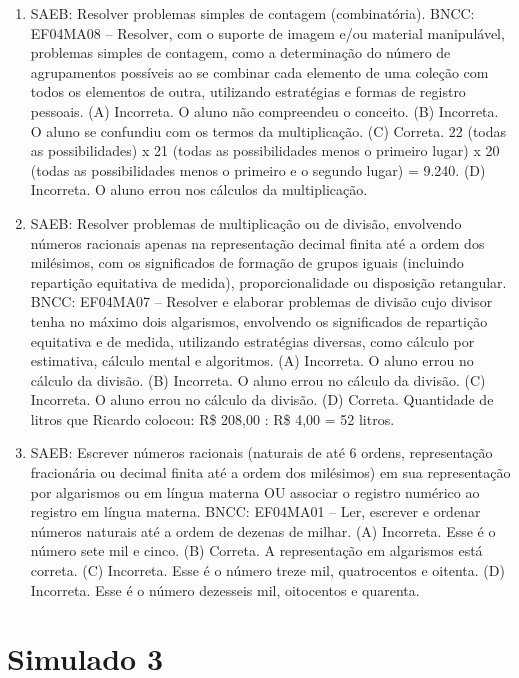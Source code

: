 \begin{enumerate}
\item
SAEB: Resolver problemas simples de contagem (combinatória).
BNCC: EF04MA08 -- Resolver, com o suporte de imagem e/ou material manipulável, problemas simples
de contagem, como a determinação do número de agrupamentos possíveis ao se combinar cada
elemento de uma coleção com todos os elementos de outra, utilizando estratégias e formas de
registro pessoais.
(A) Incorreta. O aluno não compreendeu o conceito.
(B) Incorreta. O aluno se confundiu com os termos da multiplicação.
(C) Correta. 22 (todas as possibilidades) x 21 (todas as possibilidades menos o primeiro lugar) x 20 (todas as possibilidades menos o primeiro e o segundo lugar) = 9.240.
(D) Incorreta. O aluno errou nos cálculos da multiplicação.

\item
SAEB: Resolver problemas de multiplicação ou de divisão,
envolvendo números racionais apenas na representação decimal finita até
a ordem dos milésimos, com os significados de formação de grupos iguais
(incluindo repartição equitativa de medida), proporcionalidade ou
disposição retangular.
BNCC: EF04MA07 -- Resolver e elaborar problemas de divisão cujo divisor tenha no máximo dois algarismos,
envolvendo os significados de repartição equitativa e de medida, utilizando estratégias diversas,
como cálculo por estimativa, cálculo mental e algoritmos.
(A) Incorreta. O aluno errou no cálculo da divisão.
(B) Incorreta. O aluno errou no cálculo da divisão.
(C) Incorreta. O aluno errou no cálculo da divisão.
(D) Correta. Quantidade de litros que Ricardo colocou: R\$ 208,00 : R\$ 4,00 = 52
litros.

\item
SAEB: Escrever números racionais (naturais de até 6 ordens, representação
fracionária ou decimal finita até a ordem dos milésimos) em sua
representação por algarismos ou em língua materna OU associar o registro
numérico ao registro em língua materna.
BNCC: EF04MA01 -- Ler, escrever e ordenar números naturais até a ordem de dezenas de milhar.
(A) Incorreta. Esse é o número sete mil e cinco.
(B) Correta. A representação em algarismos está correta.
(C) Incorreta. Esse é o número treze mil, quatrocentos e oitenta.
(D) Incorreta. Esse é o número dezesseis mil, oitocentos e quarenta.
\end{enumerate}

\section*{Simulado 3}


